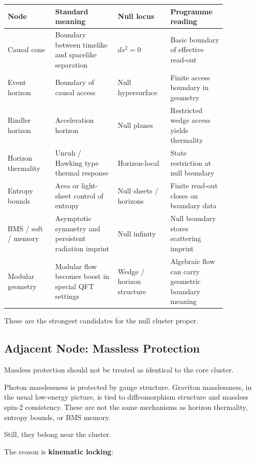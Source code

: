 \documentclass[12pt,a4paper]{article}
\theoremstyle{definition}
\theoremstyle{remark}
\begin{document}
\begin{center}
\begin{tabular}{P{0.19\linewidth}P{0.25\linewidth}P{0.19\linewidth}P{0.22\linewidth}}
\toprule
\textbf{Node} & \textbf{Standard meaning} & \textbf{Null locus} & \textbf{Programme reading} \\
\midrule
Causal cone & Boundary between timelike and spacelike separation & $ds^2=0$ & Basic boundary of effective read-out \\
Event horizon & Boundary of causal access & Null hypersurface & Finite access boundary in geometry \\
Rindler horizon & Acceleration horizon & Null planes & Restricted wedge access yields thermality \\
Horizon thermality & Unruh / Hawking type thermal response & Horizon-local & State restriction at null boundary \\
Entropy bounds & Area or light-sheet control of entropy & Null sheets / horizons & Finite read-out closes on boundary data \\
BMS / soft / memory & Asymptotic symmetry and persistent radiation imprint & Null infinity & Null boundary stores scattering imprint \\
Modular geometry & Modular flow becomes boost in special QFT settings & Wedge / horizon structure & Algebraic flow can carry geometric boundary meaning \\
\bottomrule
\end{tabular}
\end{center}

These are the strongest candidates for the null cluster proper.

\subsection{Adjacent Node: Massless
Protection}\label{adjacent-node-massless-protection}

Massless protection should not be treated as identical to the core
cluster.

Photon masslessness is protected by gauge structure. Graviton
masslessness, in the usual low-energy picture, is tied to diffeomorphism
structure and massless spin-2 consistency. These are not the same
mechanisms as horizon thermality, entropy bounds, or BMS memory.

Still, they belong near the cluster.

The reason is \textbf{kinematic locking}:
\end{document}
